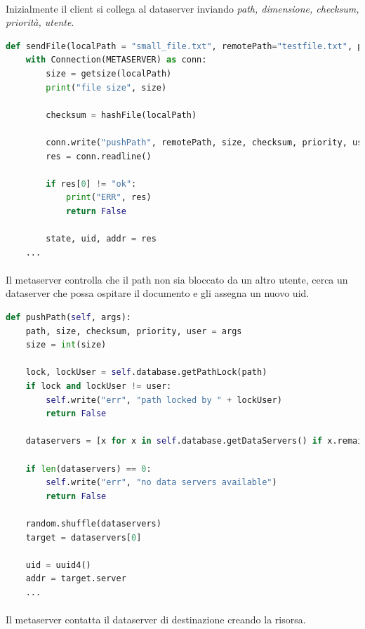 \documentclass[11pt,a4paper,english]{article}
\begin{document}
\paragraph{} Inizialmente il client si collega al dataserver inviando \emph{path, dimensione, checksum, priorità, utente}.

\begin{lstlisting}[language=Python, title=Client]
def sendFile(localPath = "small_file.txt", remotePath="testfile.txt", priority=1, user="default"):
    with Connection(METASERVER) as conn:
        size = getsize(localPath)
        print("file size", size)

        checksum = hashFile(localPath)

        conn.write("pushPath", remotePath, size, checksum, priority, user)
        res = conn.readline()

        if res[0] != "ok":
            print("ERR", res)
            return False

        state, uid, addr = res
    ...
\end{lstlisting}

\paragraph{} Il metaserver controlla che il path non sia bloccato da un altro utente, cerca un dataserver che possa ospitare il documento e gli assegna un nuovo uid.

\begin{lstlisting}[language=Python, title=Metaserver]
def pushPath(self, args):
    path, size, checksum, priority, user = args
    size = int(size)

    lock, lockUser = self.database.getPathLock(path)
    if lock and lockUser != user:
        self.write("err", "path locked by " + lockUser)
        return False

    dataservers = [x for x in self.database.getDataServers() if x.remaining_capacity > size]

    if len(dataservers) == 0:
        self.write("err", "no data servers available")
        return False

    random.shuffle(dataservers)
    target = dataservers[0]

    uid = uuid4()
    addr = target.server
    ...
\end{lstlisting}

\paragraph{} Il metaserver contatta il dataserver di destinazione creando la risorsa.
\end{document}
